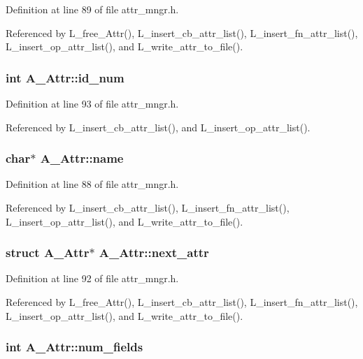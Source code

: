 Definition at line 89 of file attr\_\-mngr.h.

Referenced by L\_\-free\_\-Attr(), L\_\-insert\_\-cb\_\-attr\_\-list(), L\_\-insert\_\-fn\_\-attr\_\-list(), L\_\-insert\_\-op\_\-attr\_\-list(), and L\_\-write\_\-attr\_\-to\_\-file().
\subsubsection{\setlength{\rightskip}{0pt plus 5cm}int \bf{A\_\-Attr::id\_\-num}}\label{structA__Attr_a85f86a9f863f8a7ee430735bd8d6cd7}




Definition at line 93 of file attr\_\-mngr.h.

Referenced by L\_\-insert\_\-cb\_\-attr\_\-list(), and L\_\-insert\_\-op\_\-attr\_\-list().
\subsubsection{\setlength{\rightskip}{0pt plus 5cm}char$\ast$ \bf{A\_\-Attr::name}}\label{structA__Attr_2f0b4c0cb65639e9398d061126d38a0e}




Definition at line 88 of file attr\_\-mngr.h.

Referenced by L\_\-insert\_\-cb\_\-attr\_\-list(), L\_\-insert\_\-fn\_\-attr\_\-list(), L\_\-insert\_\-op\_\-attr\_\-list(), and L\_\-write\_\-attr\_\-to\_\-file().
\subsubsection{\setlength{\rightskip}{0pt plus 5cm}struct \bf{A\_\-Attr}$\ast$ \bf{A\_\-Attr::next\_\-attr}}\label{structA__Attr_fb5ac673f561eb496924e2340c71970c}




Definition at line 92 of file attr\_\-mngr.h.

Referenced by L\_\-free\_\-Attr(), L\_\-insert\_\-cb\_\-attr\_\-list(), L\_\-insert\_\-fn\_\-attr\_\-list(), L\_\-insert\_\-op\_\-attr\_\-list(), and L\_\-write\_\-attr\_\-to\_\-file().
\subsubsection{\setlength{\rightskip}{0pt plus 5cm}int \bf{A\_\-Attr::num\_\-fields}}\label{structA__Attr_4f36fedb38ab9806397922cf7a0e3416}




